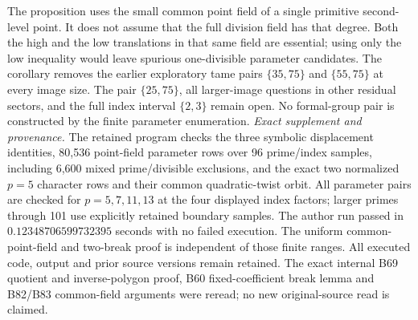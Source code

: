 \begin{remark}
\label{rem:B-RD84-scope}
The proposition uses the small common point field of a
single primitive second-level point. It does not assume
that the full division field has that degree. Both the
high and the low translations in that same field are
essential; using only the low inequality would leave
spurious one-divisible parameter candidates.
The corollary removes the earlier exploratory tame pairs
\(\{35,75\}\) and \(\{55,75\}\) at every image size.
The pair \(\{25,75\}\), all larger-image questions in
other residual sectors, and the full index interval
\(\{2,3\}\) remain open. No formal-group pair is
constructed by the finite parameter enumeration.
\smallskip
\noindent\emph{Exact supplement and provenance.}
The retained program
checks the three symbolic displacement identities,
80,536 point-field parameter rows over 96 prime/index
samples, including 6,600 mixed prime/divisible exclusions,
and the exact two normalized \(p=5\) character rows and
their common quadratic-twist orbit. All parameter pairs
are checked for \(p=5,7,11,13\) at the four displayed
index factors; larger primes through 101 use explicitly
retained boundary samples. The author run passed in
\(0.12348706599732395\) seconds with no failed execution.
The uniform common-point-field and two-break proof is
independent of those finite ranges. All executed code,
output and prior source versions remain retained.
The exact internal B69 quotient and inverse-polygon proof,
B60 fixed-coefficient break lemma and B82/B83 common-field
arguments were reread; no new original-source read is
claimed.
\end{remark}
